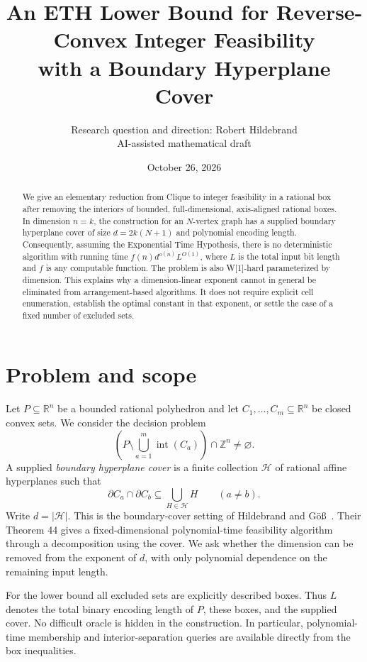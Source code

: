 \documentclass[11pt]{article}
\title{An ETH Lower Bound for Reverse-Convex Integer Feasibility\protect\\with a Boundary Hyperplane Cover}
\author{Research question and direction: Robert Hildebrand\\AI-assisted mathematical draft}
\date{October 26, 2026}
\newcommand{\Z}{\mathbb Z}
\newcommand{\R}{\mathbb R}
\DeclareMathOperator{\intr}{int}
\begin{document}
\maketitle
\begin{abstract}
We give an elementary reduction from Clique to integer feasibility in a rational box after removing the interiors of bounded, full-dimensional, axis-aligned rational boxes. In dimension $n=k$, the construction for an $N$-vertex graph has a supplied boundary hyperplane cover of size $d=2k(N+1)$ and polynomial encoding length. Consequently, assuming the Exponential Time Hypothesis, there is no deterministic algorithm with running time $f(n)d^{o(n)}L^{O(1)}$, where $L$ is the total input bit length and $f$ is any computable function. The problem is also W[1]-hard parameterized by dimension. This explains why a dimension-linear exponent cannot in general be eliminated from arrangement-based algorithms. It does not require explicit cell enumeration, establish the optimal constant in that exponent, or settle the case of a fixed number of excluded sets.
\end{abstract}

\section{Problem and scope}
Let $P\subseteq\R^n$ be a bounded rational polyhedron and let $C_1,\ldots,C_m\subseteq\R^n$ be closed convex sets. We consider the decision problem
\begin{equation}\label{eq:problem}
\left(P\setminus\bigcup_{a=1}^m\intr(C_a)\right)\cap\Z^n\ne\varnothing.
\end{equation}
A supplied \emph{boundary hyperplane cover} is a finite collection $\mathcal H$ of rational affine hyperplanes such that
\[
\partial C_a\cap\partial C_b\subseteq\bigcup_{H\in\mathcal H}H
\qquad(a\ne b).
\]
Write $d=|\mathcal H|$. This is the boundary-cover setting of Hildebrand and G\"o\ss~\cite{HG}. Their Theorem 44 gives a fixed-dimensional polynomial-time feasibility algorithm through a decomposition using the cover. We ask whether the dimension can be removed from the exponent of $d$, with only polynomial dependence on the remaining input length.

For the lower bound all excluded sets are explicitly described boxes. Thus $L$ denotes the total binary encoding length of $P$, these boxes, and the supplied cover. No difficult oracle is hidden in the construction. In particular, polynomial-time membership and interior-separation queries are available directly from the box inequalities.
\end{document}
